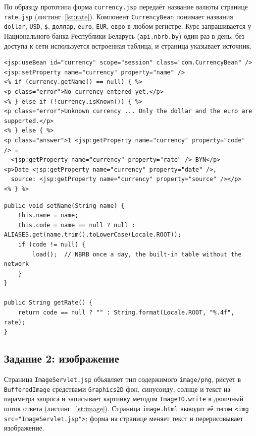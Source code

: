 \documentclass[14pt,a4paper]{extarticle}
\begin{document}
По образцу прототипа форма \texttt{currency.jsp} передаёт название валюты странице
\texttt{rate.jsp} (листинг~\ref{lst:rate}). Компонент \texttt{CurrencyBean} понимает
названия \texttt{dollar}, \texttt{USD}, \texttt{\$}, \texttt{доллар}, \texttt{euro},
\texttt{EUR}, \texttt{евро} в любом регистре. Курс запрашивается у Национального банка
Республики Беларусь (\texttt{api.nbrb.by}) один раз в день; без доступа к сети
используется встроенная таблица, и страница указывает источник.

\begin{lstlisting}[style=jsp, caption={Страница rate.jsp}, label={lst:rate}]
<jsp:useBean id="currency" scope="session" class="com.CurrencyBean" />
<jsp:setProperty name="currency" property="name" />
<% if (currency.getName() == null) { %>
<p class="error">No currency entered yet.</p>
<% } else if (!currency.isKnown()) { %>
<p class="error">Unknown currency ... Only the dollar and the euro are supported.</p>
<% } else { %>
<p class="answer">1 <jsp:getProperty name="currency" property="code" /> =
  <jsp:getProperty name="currency" property="rate" /> BYN</p>
<p>Date <jsp:getProperty name="currency" property="date" />,
  source: <jsp:getProperty name="currency" property="source" /></p>
<% } %>
\end{lstlisting}

\begin{lstlisting}[style=java, caption={Свойство name компонента CurrencyBean}, label={lst:bean}]
public void setName(String name) {
    this.name = name;
    this.code = name == null ? null : ALIASES.get(name.trim().toLowerCase(Locale.ROOT));
    if (code != null) {
        load();  // NBRB once a day, the built-in table without the network
    }
}

public String getRate() {
    return code == null ? "" : String.format(Locale.ROOT, "%.4f", rate);
}
\end{lstlisting}

\subsection{Задание 2: изображение}

Страница \texttt{ImageServlet.jsp} объявляет тип содержимого \texttt{image/png},
рисует в \texttt{BufferedImage} средствами \texttt{Graphics2D} фон, синусоиду, солнце и
текст из параметра запроса и записывает картинку методом \texttt{ImageIO.write} в
двоичный поток ответа (листинг~\ref{lst:image}). Страница \texttt{image.html} выводит
её тегом \texttt{<img src="ImageServlet.jsp">}; форма на странице меняет текст и
перерисовывает изображение.
\end{document}
